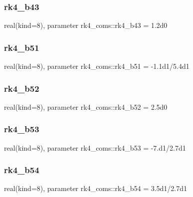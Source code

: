 \subsubsection{\texorpdfstring{rk4\+\_\+b43}{rk4\_b43}}
{\footnotesize\ttfamily real(kind=8), parameter rk4\+\_\+coms\+::rk4\+\_\+b43 = 1.\+2d0}

\mbox{\label{namespacerk4__coms_a0667d689a2690f395681dd54718dd9b0}} 
\subsubsection{\texorpdfstring{rk4\+\_\+b51}{rk4\_b51}}
{\footnotesize\ttfamily real(kind=8), parameter rk4\+\_\+coms\+::rk4\+\_\+b51 = -\/1.\+1d1/5.\+4d1}

\mbox{\label{namespacerk4__coms_a08136775ca79aa4cfb6e2bc844bfb689}} 
\subsubsection{\texorpdfstring{rk4\+\_\+b52}{rk4\_b52}}
{\footnotesize\ttfamily real(kind=8), parameter rk4\+\_\+coms\+::rk4\+\_\+b52 = 2.\+5d0}

\mbox{\label{namespacerk4__coms_adedd306e0a9a351610026b3a12d2e5ce}} 
\subsubsection{\texorpdfstring{rk4\+\_\+b53}{rk4\_b53}}
{\footnotesize\ttfamily real(kind=8), parameter rk4\+\_\+coms\+::rk4\+\_\+b53 = -\/7.d1/2.\+7d1}

\mbox{\label{namespacerk4__coms_a3d702309397c009b9a62c0900da4a7c5}} 
\subsubsection{\texorpdfstring{rk4\+\_\+b54}{rk4\_b54}}
{\footnotesize\ttfamily real(kind=8), parameter rk4\+\_\+coms\+::rk4\+\_\+b54 = 3.\+5d1/2.\+7d1}

